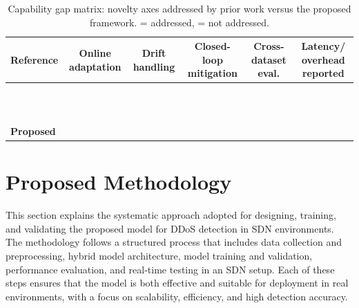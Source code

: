 \documentclass[ASNA,twocolumn]{USG} %
\providecommand{\cmark}{\ding{51}}%
\providecommand{\xmark}{\ding{55}}%
\begin{document}
\begin{table}[hbt!]
\centering
\caption{Capability gap matrix: novelty axes addressed by prior work versus the proposed framework. \cmark{} = addressed, \xmark{} = not addressed.}
\label{tab:gap_matrix}
\renewcommand{\arraystretch}{1.2}
\begin{tabular}{|p{2.0cm}|c|c|c|c|c|}
\hline
\textbf{Reference} & \textbf{Online adaptation} & \textbf{Drift handling} & \textbf{Closed-loop mitigation} & \textbf{Cross-dataset eval.} & \textbf{Latency/ overhead reported} \\
\hline
\cite{tan2020new} & \xmark & \xmark & \xmark & \xmark & \xmark \\ \hline
\cite{khashab2021ddos} & \xmark & \xmark & \xmark & \xmark & \xmark \\ \hline
\cite{nugraha2020deep} & \xmark & \xmark & \xmark & \xmark & \xmark \\ \hline
\cite{novaes2021adversarial} & \xmark & \xmark & \xmark & \xmark & \xmark \\ \hline
\cite{elubeyd2023hybrid} & \xmark & \xmark & \xmark & \xmark & \xmark \\ \hline
\cite{priyadarshini2023sdn} & \xmark & \xmark & \xmark & \xmark & \xmark \\ \hline
\cite{xu2025deep} & \xmark & \xmark & \xmark & \xmark & \xmark \\ \hline
\cite{ma2023real} & \xmark & \xmark & \xmark & \xmark & \xmark \\ \hline
\cite{ain2025securing} & \xmark & \xmark & \xmark & \xmark & \cmark \\ \hline
\cite{wang2024detection} & \xmark & \xmark & \cmark & \xmark & \xmark \\ \hline
\cite{alqahtani2024incremental} & \cmark & \cmark & \xmark & \xmark & \xmark \\ \hline
\rowcolor{gray!20}
\textbf{Proposed} & \cmark & \cmark & \cmark & \cmark & \cmark \\ \hline
\end{tabular}
\end{table}


\section{Proposed Methodology} \label{sec:methodology}

This section explains the systematic approach adopted for designing, training, and validating the proposed model for DDoS detection in SDN environments. The methodology follows a structured process that includes data collection and preprocessing, hybrid model architecture, model training and validation, performance evaluation, and real-time testing in an SDN setup. Each of these steps ensures that the model is both effective and suitable for deployment in real environments, with a focus on scalability, efficiency, and high detection accuracy. 
\end{document}
